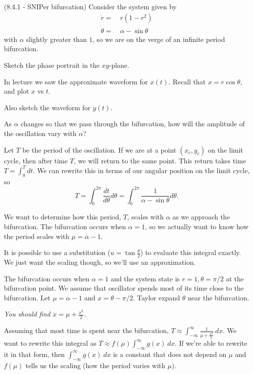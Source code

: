 \documentclass[12pt,letterpaper,noanswers]{exam}
\begin{document}
\begin{questions}
\item (8.4.1 - SNIPer bifurcation) Consider the system given by 
\begin{align*}
\dot{r} = &\ r(1-r^2) \\
\dot{\theta} = &\ \alpha - \sin\theta
\end{align*}
with $\alpha$ slightly greater than $1$, so we are on the verge of an infinite period bifurcation.
\begin{parts}
\item Sketch the phase portrait in the $xy$-plane.
\item In lecture we saw the approximate waveform for $x(t)$.  Recall that $x = r\cos\theta$, and plot $x$ vs $t$.
\item Also sketch the waveform for $y(t)$.
\item As $\alpha$ changes so that we pass through the bifurcation, how will the amplitude of the oscillation vary with $\alpha$?
\item Let $T$ be the period of the oscillation.  If we are at a point $(x_c, y_c)$ on the limit cycle, then after time $T$, we will return to the same point.  This return takes time $T = \int_0^T dt$.  We can rewrite this in terms of our angular position on the limit cycle, so \[T = \int_0^{2\pi} \frac{dt}{d\theta}d\theta = \int_0^{2\pi} \frac{1}{\alpha-\sin\theta}d\theta.\]

We want to determine how this period, $T$, scales with $\alpha$ as we approach the bifurcation.  The bifurcation occurs when $\alpha = 1$, so we actually want to know how the period scales with $\mu = \alpha - 1$.

It is possible to use a substitution ($u = \tan \frac{\theta}{2}$) to evaluate this integral exactly.  We just want the scaling though, so we'll use an approximation.

The bifurcation occurs when $\alpha = 1$ and the system state is $r = 1, \theta = \pi/2$ at the bifurcation point.  We assume that oscillator spends most of its time close to the bifurcation.  Let $\mu = \alpha -1$ and $x = \theta - \pi/2$.  Taylor expand $\dot{\theta}$ near the bifurcation.

\emph{You should find $\dot{x} = \mu + \frac{x^2}{2}$.}

\item Assuming that most time is spent near the bifurcation, $\displaystyle T \approx \int_{-\infty}^{\infty} \frac{1}{\mu + \frac{x^2}{2}}\ dx.$  We want to rewrite this integral as $T\approx f(\mu) \int_{-\infty}^{\infty} g(x) \ dx$.  If we're able to rewrite it in that form, then $\int_{-\infty}^{\infty} g(x) \ dx$ is a constant that does not depend on $\mu$ and $f(\mu)$ tells us the scaling (how the period varies with $\mu$).


\end{parts}
\end{questions}
\end{document}

